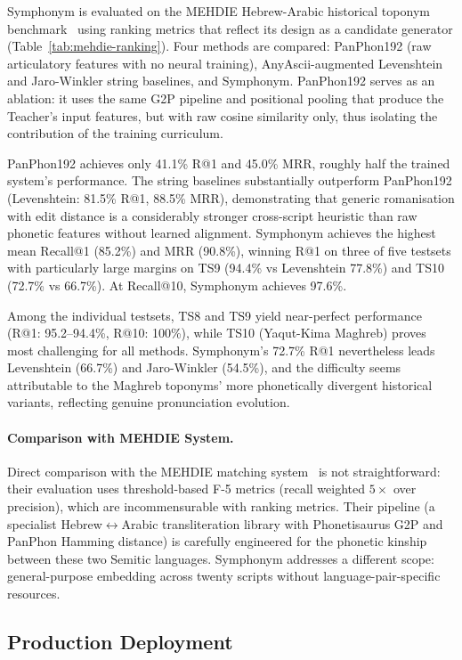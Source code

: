 \documentclass[11pt,a4paper]{article}
\begin{document}
Symphonym is evaluated on the MEHDIE Hebrew-Arabic historical toponym benchmark~\citep{mehdie2025} using ranking metrics that reflect its design as a candidate generator (Table~\ref{tab:mehdie-ranking}). Four methods are compared: PanPhon192 (raw articulatory features with no neural training), AnyAscii-augmented Levenshtein and Jaro-Winkler string baselines, and Symphonym. PanPhon192 serves as an ablation: it uses the same G2P pipeline and positional pooling that produce the Teacher's input features, but with raw cosine similarity only, thus isolating the contribution of the training curriculum.

PanPhon192 achieves only 41.1\% R@1 and 45.0\% MRR, roughly half the trained system's performance. The string baselines substantially outperform PanPhon192 (Levenshtein: 81.5\% R@1, 88.5\% MRR), demonstrating that generic romanisation with edit distance is a considerably stronger cross-script heuristic than raw phonetic features without learned alignment. Symphonym achieves the highest mean Recall@1 (85.2\%) and MRR (90.8\%), winning R@1 on three of five testsets with particularly large margins on TS9 (94.4\% vs Levenshtein 77.8\%) and TS10 (72.7\% vs 66.7\%). At Recall@10, Symphonym achieves 97.6\%.

Among the individual testsets, TS8 and TS9 yield near-perfect performance (R@1: 95.2--94.4\%, R@10: 100\%), while TS10 (Yaqut-Kima Maghreb) proves most challenging for all methods. Symphonym's 72.7\% R@1 nevertheless leads Levenshtein (66.7\%) and Jaro-Winkler (54.5\%), and the difficulty seems attributable to the Maghreb toponyms' more phonetically divergent historical variants, reflecting genuine pronunciation evolution.

\paragraph{Comparison with MEHDIE System.} Direct comparison with the MEHDIE matching system~\citep{mehdie2025} is not straightforward: their evaluation uses threshold-based F-5 metrics (recall weighted $5\times$ over precision), which are incommensurable with ranking metrics. Their pipeline (a specialist Hebrew$\leftrightarrow$Arabic transliteration library with Phonetisaurus G2P and PanPhon Hamming distance) is carefully engineered for the phonetic kinship between these two Semitic languages. Symphonym addresses a different scope: general-purpose embedding across twenty scripts without language-pair-specific resources.

\subsection{Production Deployment}
\end{document}
